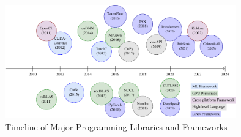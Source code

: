 \begin{figure}
    \centering
    \includegraphics[width=0.892\textwidth]{figures/timeline}
    \caption{Timeline of Major Programming Libraries and Frameworks}
    \label{fig:gpu_timeline}
\end{figure}  